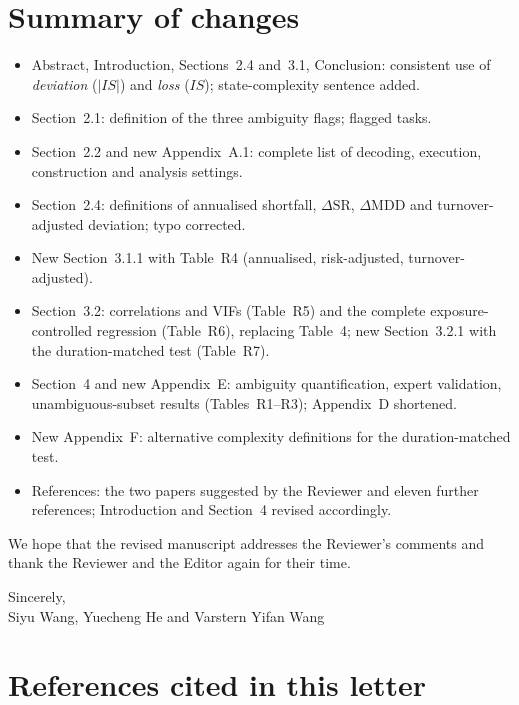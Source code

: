 \documentclass[11pt,a4paper]{article}
\begin{document}
\section*{Summary of changes}
\begin{itemize}[nosep,leftmargin=1.2em]
\item Abstract, Introduction, Sections~2.4 and~3.1, Conclusion: consistent use of \emph{deviation} ($|IS|$) and \emph{loss} ($IS$); state-complexity sentence added.
\item Section~2.1: definition of the three ambiguity flags; \RevAmbCount{} flagged tasks.
\item Section~2.2 and new Appendix~A.1: complete list of decoding, execution, construction and analysis settings.
\item Section~2.4: definitions of annualised shortfall, $\Delta\mathrm{SR}$, $\Delta\mathrm{MDD}$ and turnover-adjusted deviation; typo corrected.
\item New Section~3.1.1 with Table~R4 (annualised, risk-adjusted, turnover-adjusted).
\item Section~3.2: correlations and VIFs (Table~R5) and the complete exposure-controlled regression (Table~R6), replacing Table~4; new Section~3.2.1 with the duration-matched test (Table~R7).
\item Section~4 and new Appendix~E: ambiguity quantification, expert validation, unambiguous-subset results (Tables~R1--R3); Appendix~D shortened.
\item New Appendix~F: alternative complexity definitions for the duration-matched test.
\item References: the two papers suggested by the Reviewer and eleven further references; Introduction and Section~4 revised accordingly.
\end{itemize}

\noindent We hope that the revised manuscript addresses the Reviewer's comments and thank the Reviewer and the Editor again for their time.

\medskip\noindent Sincerely,\\
Siyu Wang, Yuecheng He and Varstern Yifan Wang

\section*{References cited in this letter}


\end{document}
